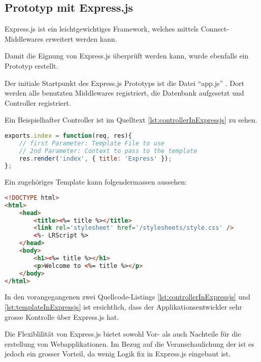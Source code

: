 \subsection{Prototyp mit Express.js}

Express.js \cite{Expressjs} ist ein leichtgewichtiges Framework, welches mittels Connect-Middlewares \cite{connect} erweitert werden kann.

Damit die Eignung von Express.js überprüft werden kann, wurde ebenfalls ein Prototyp \cite{ExpressjsPrototyp} erstellt.

Der initiale Startpunkt des Express.js Prototyps ist die Datei ``app.js'' \cite{ExpressjsPrototypAppjs}. Dort werden alle benutzten Middlewares registriert, die Datenbank aufgesetzt und Controller registriert.

Ein Beispielhafter Controller ist im Quelltext \ref{lst:controllerInExpressjs} zu sehen.

\begin{lstlisting}[language=JavaScript, caption=Beispiel eines Controllers in Express.js, label=lst:controllerInExpressjs]
exports.index = function(req, res){
	// first Parameter: Template File to use
	// 2nd Parameter: Context to pass to the template
	res.render('index', { title: 'Express' });
};
\end{lstlisting}

Ein zugehöriges Template kann folgendermassen aussehen:

\begin{lstlisting}[language=HTML, caption=Template in Express.js, label=lst:templateInExpressjs]
<!DOCTYPE html>
<html>
	<head>
		<title><%= title %></title>
		<link rel='stylesheet' href='/stylesheets/style.css' />
		<%- LRScript %>
	</head>
	<body>
		<h1><%= title %></h1>
		<p>Welcome to <%= title %></p>
	</body>
</html>
\end{lstlisting}

In den vorangegangenen zwei Quellcode-Listings \ref{lst:controllerInExpressjs} und \ref{lst:templateInExpressjs} ist ersichtlich, dass der Applikationsentwickler sehr grosse Kontrolle über Express.js hat.

Die Flexiblilität von Express.js bietet sowohl Vor- als auch Nachteile für die erstellung von Webapplikationen. Im Bezug auf die Veranschaulichung der  ist es jedoch ein grosser Vorteil, da wenig Logik fix in Express.js eingebaut ist.